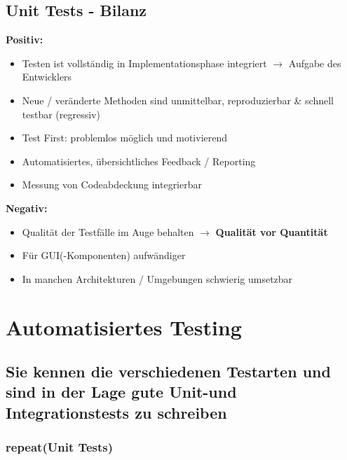 \documentclass[a4paper]{article}
\begin{document}
		\subsection{Unit Tests - Bilanz}
		
		\textbf{Positiv:}
		\begin{itemize}
			\item Testen ist vollständig in Implementationsphase integriert $\rightarrow$ Aufgabe des Entwicklers
			\item Neue / veränderte Methoden sind unmittelbar, reproduzierbar \& schnell testbar (regressiv)
			\item Test First: problemlos möglich und motivierend
			\item Automatisiertes, übersichtliches Feedback / Reporting
			\item Messung von Codeabdeckung integrierbar
		\end{itemize}
		\textbf{Negativ:}
		\begin{itemize}
			\item Qualität der Testfälle im Auge behalten $\rightarrow$ \textbf{Qualität vor Quantität}
			\item Für GUI(-Komponenten) aufwändiger
			\item In manchen Architekturen / Umgebungen schwierig umsetzbar
		\end{itemize} 
		
	\newpage
	\section{Automatisiertes Testing}
	
		\subsection{Sie kennen die verschiedenen Testarten und sind in der Lage gute Unit-und Integrationstests zu schreiben}
		
			\subsubsection{repeat(Unit Tests)}
			
\end{document}

